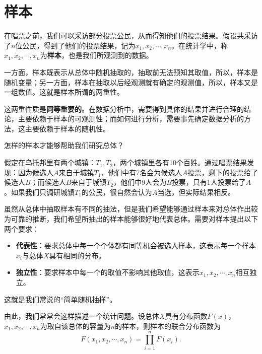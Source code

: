 \section{样本}
\begin{example}[（总统选举 - 续）]
    在唱票之前，我们可以采访部分投票公民，从而得知他们的投票结果。假设共采访了$n$位公民，得到了他们的投票结果，记为$x_1,x_2,\cdots,x_n$。在统计学中，称$x_1,x_2,\cdots,x_n$为\textbf{样本}，也是我们所观测到的数据。
\end{example}
\begin{remark}
    一方面，样本既表示从总体中随机抽取的，抽取前无法预知其取值，所以，样本是随机变量；另一方面，样本在抽取以后经观测就有确定的观测值，所以，样本又是一组数值。这就是样本所谓的两重性。

    这两重性质是\textbf{同等重要的}。在数据分析中，需要得到具体的结果并进行合理的结论，主要依赖于样本的可观测性；而如何进行分析，需要事先确定数据分析的方法，这主要依赖于样本的随机性。
\end{remark}



\begin{problem}
    怎样的样本才能够帮助我们研究总体？
\end{problem} 

\begin{example}[（总统选举 - 续）]
假定在乌托邦里有两个城镇：$T_1,T_2$，两个城镇里各有10个百姓。通过唱票结果发现：因为候选人$A$来自于城镇$T_1$，他们中有7名会为候选人$A$投票，剩下的投票给了候选人$B$；而候选人$B$来自于城镇$T_2$，他们中9人会为$B$投票，只有1人投票给了$A$。如果我们只调研城镇$T_1$的公民，很自然会认为$A$当选，但实际结果相反。
\end{example}

虽然从总体中抽取样本有不同的抽法，但是我们希望能够通过样本来对总体作出较为可靠的推断，我们希望所抽出的样本能够很好地代表总体。需要对样本提出以下两个要求：
\begin{itemize}
    \item \textbf{代表性}：要求总体中每一个个体都有同等机会被选入样本，这表示每一个样本$x_i$与总体$X$具有相同的分布。
    \item \textbf{独立性}：要求样本中每一个的取值不影响其他取值，这表示$x_1,x_2,\cdots,x_n$相互独立。
\end{itemize}
这就是我们常说的“简单随机抽样”。

由此，我们常常会这样描述一个统计问题。设总体$X$具有分布函数$F(x)$，$x_1,x_2,\cdots,x_n$为取自该总体的容量为$n$的样本，则样本的联合分布函数为
$$
F(x_1,x_2,\cdots,x_n) = \prod_{i=1}^n F(x_i).
$$

